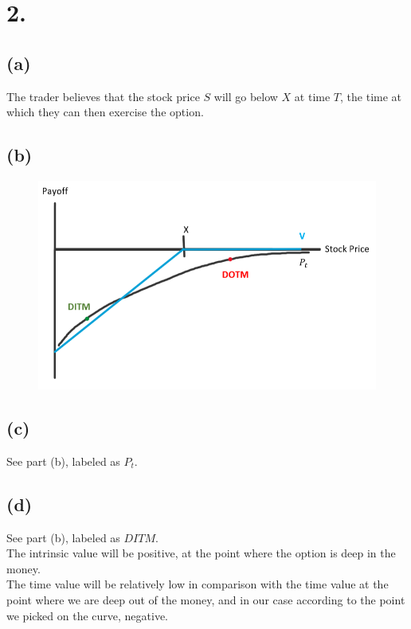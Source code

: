 \documentclass{article}
\begin{document}
\section*{2.}
{\Large

\subsection*{(a)}

The trader believes that the stock price $S$ will go below $X$ at time $T$, the time at which they can then exercise the option. 

\subsection*{(b)}

\begin{figure}[h]
  \centering
  \includegraphics[width=120mm]{./2flip.png}
\end{figure}

\subsection*{(c)}

See part (b), labeled as $P_t$.

\subsection*{(d)}

See part (b), labeled as $DITM$. \\
The intrinsic value will be positive, at the point where the option is deep in the money. \\
The time value will be relatively low in comparison with the time value at the point where we are deep out of the money, and in our case according to the point we picked on the curve, negative.

}
\end{document}
